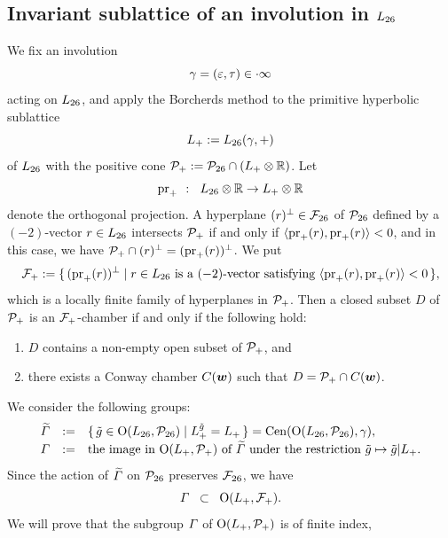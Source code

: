\documentclass{amsart} %
\begin{document}
\subsection{Invariant sublattice of an involution in $L_{26}$}\label{subsec:sublatLts}
%
We fix an involution
%
\begin{equation*}\label{eq:gamma}
\gamma=(\varepsilon, \tau)\in \cdot \infty
\end{equation*}
%
 acting on $L_{26}$, and 
 apply the Borcherds method to the primitive hyperbolic sublattice
\[
L_{+}:=L_{26}(\gamma, +)
\]
of $L_{26}$ 
with the positive cone $\mathord{\mathcal{P}}_{+}:=\mathord{\mathcal{P}}_{26}\cap(L_{+}\otimes \mathord{\mathbb{R}})$.
Let
\[
\operatorname{pr}_{+}\;\;\colon\;\; L_{26}\otimes \mathord{\mathbb{R}} \to L_{+}\otimes \mathord{\mathbb{R}}
\]
denote the orthogonal projection.
A hyperplane $(r)^{\perp}\in {\mathord{\mathcal{F}}}_{26}$ of $\mathord{\mathcal{P}}_{26}$
defined by a $(-2)$-vector $r\in L_{26}$
intersects $\mathord{\mathcal{P}}_{+}$
if and only if
$\langle \operatorname{pr}_{+}(r), \operatorname{pr}_{+}(r) \rangle<0$,
and in this case,
we have $ \mathord{\mathcal{P}}_{+}\cap (r)^{\perp}=(\operatorname{pr}_{+}(r))^{\perp}$.
We put
\[
\mathord{\mathcal{F}}_{+}:=\{\,{(\operatorname{pr}_{+}(r))^{\perp}}\mid {\textrm{$r\in L_{26}$ is a $(-2)$-vector satisfying 
$\langle \operatorname{pr}_{+}(r), \operatorname{pr}_{+}(r) \rangle<0$}} \,\},
\]
which is a locally finite family of hyperplanes in $\mathord{\mathcal{P}}_{+}$.
Then a closed subset $D$ of $\mathord{\mathcal{P}}_{+}$ is 
an $\mathord{\mathcal{F}}_{+}$-chamber if and only if the following hold:
%
\begin{enumerate}[label=(\alph*)]
\item 
$D$ contains a non-empty open subset of $\mathord{\mathcal{P}}_{+}$, and 
\item there exists a Conway chamber $\mathord{C}(\boldsymbol{w})$
such that $D=\mathord{\mathcal{P}}_{+}\cap \mathord{C}(\boldsymbol{w})$.
\end{enumerate}
%
We consider the following groups: 
%
\begin{equation}\label{eq:vGamdef}
\renewcommand{\arraystretch}{1.2}
\begin{array}{ccl}
\tilvGam &:=& \set{\tilde{g}\in \OG(\Lts, \PPPts)}{\Lplus^{\tilde{g}}=\Lplus}=\Cen(\OG(\Lts, \PPPts), \gamma), \\
\vGam &:=& \textrm{the image in $\OG(\Lplus, \PPPplus)$ of $\tilvGam$ under the restriction 
$\tilde{g}\mapsto \tilde{g}|\Lplus$}.
\end{array}
\end{equation}
%
Since the action of $\widetilde{\varGamma}$ on $\mathord{\mathcal{P}}_{26}$ preserves ${\mathord{\mathcal{F}}}_{26}$, we have 
\[
\varGamma\;\;\subset \;\; \mathord{\mathrm{O}}(L_{+}, \mathord{\mathcal{F}}_{+}).
\]
We will prove that 
the subgroup $\varGamma$ of $ \mathord{\mathrm{O}}(L_{+}, \mathord{\mathcal{P}}_{+})$ is of finite index,
\end{document}
